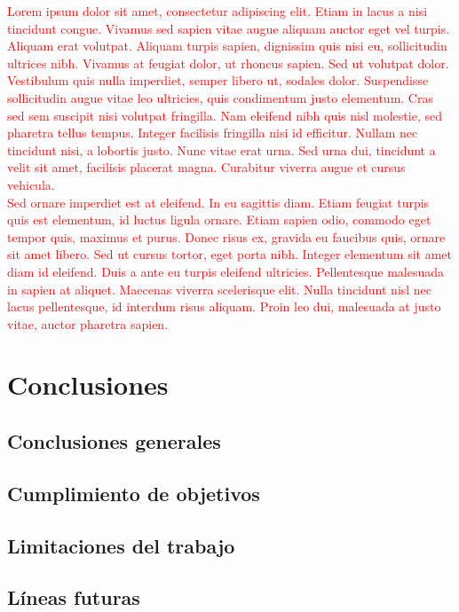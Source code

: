 \documentclass[print, color]{ugrTFG}
\begin{document}
 
\textcolor{red}{
 Lorem ipsum dolor sit amet, consectetur adipiscing elit. Etiam in lacus a nisi tincidunt congue. Vivamus sed sapien vitae augue aliquam auctor eget vel turpis. Aliquam erat volutpat. Aliquam turpis sapien, dignissim quis nisi eu, sollicitudin ultrices nibh. Vivamus at feugiat dolor, ut rhoncus sapien. Sed ut volutpat dolor. Vestibulum quis nulla imperdiet, semper libero ut, sodales dolor. Suspendisse sollicitudin augue vitae leo ultricies, quis condimentum justo elementum. Cras sed sem suscipit nisi volutpat fringilla. Nam eleifend nibh quis nisl molestie, sed pharetra tellus tempus. Integer facilisis fringilla nisi id efficitur. Nullam nec tincidunt nisi, a lobortis justo. Nunc vitae erat urna. Sed urna dui, tincidunt a velit sit amet, facilisis placerat magna. Curabitur viverra augue et cursus vehicula.\\ 
Sed ornare imperdiet est at eleifend. In eu sagittis diam. Etiam feugiat turpis quis est elementum, id luctus ligula ornare. Etiam sapien odio, commodo eget tempor quis, maximus et purus. Donec risus ex, gravida eu faucibus quis, ornare sit amet libero. Sed ut cursus tortor, eget porta nibh. Integer elementum sit amet diam id eleifend. Duis a ante eu turpis eleifend ultricies. Pellentesque malesuada in sapien at aliquet. Maecenas viverra scelerisque elit. Nulla tincidunt nisl nec lacus pellentesque, id interdum risus aliquam. Proin leo dui, malesuada at justo vitae, auctor pharetra sapien.
}\\ \newline






\chapter{Conclusiones} \label{sect:conclusiones}

\section{Conclusiones generales}

\section{Cumplimiento de objetivos}

\section{Limitaciones del trabajo}

\section{Líneas futuras}




\end{document}
